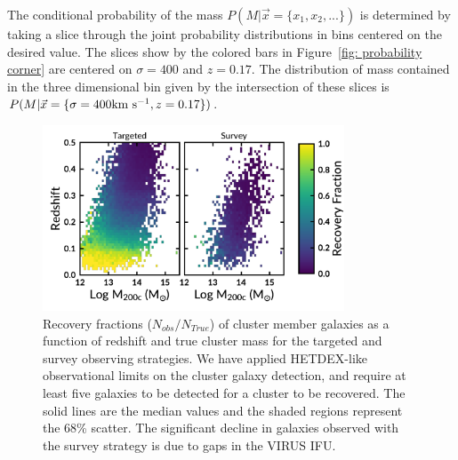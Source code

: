 \documentclass[fleqn,usenatbib]{mnras}
\begin{document}
The conditional probability of the mass $P(M|\vec{x}= \{ x_1,x_2,...\})$ is determined by taking a slice through the joint probability distributions in bins centered on the desired value. The slices show by the colored bars in Figure~\ref{fig: probability corner} are centered on $\sigma = 400$ \kms and $z=0.17$. The distribution of mass contained in the three dimensional bin given by the intersection of these slices is $P(M|\vec{x} = \{ \sigma=400 \hbox{km~s$^{-1}$},z=0.17\})$.

\begin{figure}
	\includegraphics[width=0.8\textwidth]{figures/recovery.pdf} 
	\caption{Recovery fractions ($N_{obs}/N_{True}$) of cluster member galaxies as a function of redshift and true cluster mass for the targeted and survey observing strategies. We have applied HETDEX-like observational limits on the cluster galaxy detection, and require at least five galaxies to be detected for a cluster to be recovered. The solid lines are the median values and the shaded regions represent the 68\% scatter. The significant decline in galaxies observed with the survey strategy is due to gaps in the VIRUS IFU.} \label{fig: recovery} 
\end{figure}
\end{document}
